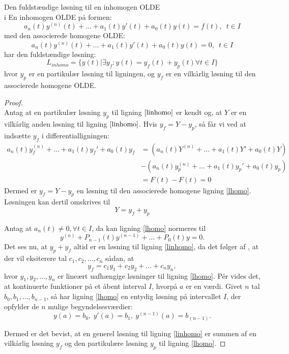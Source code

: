\begin{mytheo}{Den fuldstændige løsning til en inhomogen OLDE\\ i \citep[Theorem 5, s. 122]{EP}}{}
En inhomogen OLDE på formen: 
\begin{equation}\label{linhomo}
a_n(t)y^{(n)}(t)+\hdots +a_1(t)y'(t)+a_0(t)y(t)=f(t), \enspace t\in I
\end{equation}
med den associerede homogene OLDE:
\begin{equation}\label{lhomo}
a_n(t)y^{(n)}(t)+\hdots +a_1(t)y'(t)+a_0(t)y(t)=0, \enspace t\in I
\end{equation}
har den fuldstændige løsning:
\begin{equation}
    L_{inhomo}= \{ y(t) | \exists y_f\colon y(t)=y_f(t)+y_p(t) \forall t \in I \}
\end{equation}
hvor $y_p$ er en partikulær løsning til ligningen, og $y_f$ er en vilkårlig løsning til den associerede homogene OLDE. 
\end{mytheo}

\begin{proof}\\
Antag at en partikulær løsning $y_p$ til ligning $\eqref{linhomo}$ er kendt og, at $Y$ er en vilkårlig anden løsning til ligning $\eqref{linhomo}$. Hvis $y_f=Y-y_p$, så får vi ved at indsætte $y_f$ i differentialligningen:
\begin{align*}
    a_n(t)y_f^{(n)}+\hdots +a_1(t)y_f'+a_0(t)y_f&=
    (a_n(t)Y^{(n)}+\hdots +a_1(t)Y'+a_0(t)Y)\\
    &-(a_n(t)y_p^{(n)}+\hdots +a_1(t)y_p'+a_0(t)y_p)\\
    &=F(t)-F(t)=0
\end{align*}
Dermed er $y_f=Y-y_p$ en løsning til den associerede homogene ligning \eqref{lhomo}. Løsningen kan dertil  omskrives til
$$Y=y_f+y_p$$

\hfill \break
Antag at $a_n(t) \neq 0, \forall t \in I$, da kan ligning \eqref{lhomo} normeres til 
$$y^{(n)} + P_{n-1}(t)y^{(n-1)} + \hdots + P_0(t)y = 0.$$
Det ses nu, at $y_p+y_f$ altid er en løsning til ligning \eqref{linhomo}, da det følger af \citep[Theorem 4, s. 120]{EP}, at der vil eksiterere tal $c_1, c_2, \hdots, c_n$ sådan, at
$$y_f=c_1y_1+c_2y_2+ \hdots +c_ny_n,$$
hvor $y_1, y_2, \hdots, y_n$ er lineært uafhængige løsninger til ligning \eqref{lhomo}. Pér \citep[Theorem 2, s. 114]{EP} vides det, at kontinuerte funktioner på et åbent interval $I$, hvorpå $a$ er en værdi. Givet $n$ tal $b_0, b_1, \hdots, b_{n-1}$, så har ligning \eqref{lhomo} en entydig løsning på intervallet $I$, der opfylder de $n$ mulige begyndelsesværdier:
$$y(a)=b_0, \ y'(a)=b_1, \ y^{(n-1)}(a)=b_{(n-1)}.$$


Dermed er det bevist, at en generel løsning til ligning \eqref{linhomo} er summen af en vilkårlig løsning $y_f$ og den partikulære løsning $y_p$ til ligning \eqref{lhomo}.
\end{proof}


